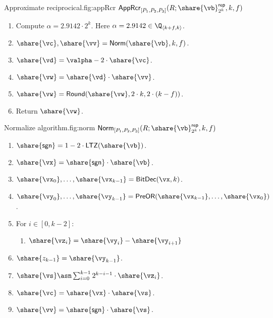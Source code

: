 \begin{Boxfig}{Approximate reciprocical.}{fig:appRcr}
  {$\mathsf{AppRcr}_{[P_1, P_2, P_3]}(R; \share{\vb}^\mathsf{rep}_{2^k}, k, f)$}
  \begin{enumerate}
    \item Compute $\alpha = 2.9142 \cdot 2^k$. Here $\alpha = 2.9142 \in \Q_{\langle k + f, k\rangle}$.
    \item $\share{\vc}, \share{\vv} = \mathsf{Norm}(\share{\vb}, k, f)$.
    \item $\share{\vd} = \valpha - 2 \cdot \share{\vc}$.
    \item $\share{\vw} = \share{\vd} \cdot \share{\vv}$.
    \item $\share{\vw} = \mathsf{Round}(\share{\vw}, 2 \cdot k, 2 \cdot (k - f))$.
  \item Return $\share{\vw}$.
\end{enumerate}
\end{Boxfig}


\begin{Boxfig}{Normalize algorithm.}{fig:norm}
  {$\mathsf{Norm}_{[P_1, P_2, P_3]}(R; \share{\vb}^\mathsf{rep}_{2^k}, k, f)$}
  \begin{enumerate}
    \item $\share{\mathsf{sgn}} = 1 - 2 \cdot \mathsf{LTZ}(\share{\vb})$.
    \item $\share{\vx} = \share{\mathsf{sgn}} \cdot \share{\vb}$.
    \item $\share{\vx_0}, \dots, \share{\vx_{k-1}} = \mathsf{BitDec}(\vx, k)$.
    \item $\share{\vy_0}, \dots, \share{\vy_{k-1}} = \mathsf{PreOR}(\share{\vx_{k-1}}, \dots, \share{\vx_0})$.
    \item For $i \in [0, k-2]$:
    \begin{enumerate}
        \item $\share{\vz_i} = \share{\vy_i} - \share{\vy_{i+1}}$
    \end{enumerate}
    \item $\share{z_{k-1}} = \share{\vy_{k-1}}$.
    \item $\share{\vs} \asn \sum_{i=0}^{k-1}2^{k-i-1} \cdot \share{\vz_i}$.
    \item $\share{\vc} = \share{\vx} \cdot \share{\vs}$.
    \item $\share{\vv} = \share{\mathsf{sgn}} \cdot \share{\vs}$.
\end{enumerate}
\end{Boxfig}



